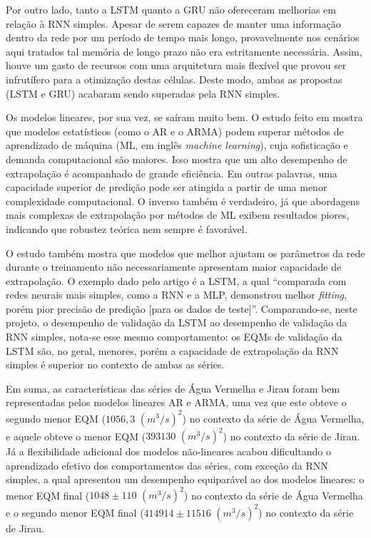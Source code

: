 \documentclass[a4paper]{article}
\begin{document}
\begin{multicols}{2}
Por outro lado, tanto a LSTM quanto a GRU não ofereceram melhorias em relação à RNN simples. Apesar de serem capazes de manter uma informação dentro da rede por um período de tempo mais longo, provavelmente nos cenários aqui tratados tal memória de longo prazo não era estritamente necessária. Assim, houve um gasto de recursos com uma arquitetura mais flexível que provou ser infrutífero para a otimização destas células. Deste modo, ambas as propostas (LSTM e GRU) acabaram sendo superadas pela RNN simples. 

Os modelos lineares, por sua vez, se saíram muito bem. O estudo feito em \cite{makridakis} mostra que modelos estatísticos (como o AR e o ARMA) podem superar métodos de aprendizado de máquina (ML, em inglês \emph{machine learning}), cuja sofisticação e demanda computacional são maiores. Isso mostra que um alto desempenho de extrapolação é acompanhado de grande eficiência. Em outras palavras, uma capacidade superior de predição pode ser atingida a partir de uma menor complexidade computacional. O inverso também é verdadeiro, já que abordagens mais complexas de extrapolação por métodos de ML exibem resultados piores, indicando que robustez teórica nem sempre é favorável.

O estudo \cite{makridakis} também mostra que modelos que melhor ajustam os parâmetros da rede durante o treinamento não necessariamente apresentam maior capacidade de extrapolação. O exemplo dado pelo artigo é a LSTM, a qual ``comparada com redes neurais mais simples, como a RNN e a MLP, demonstrou melhor \emph{fitting}, porém pior precisão de predição [para os dados de teste]''. Comparando-se, neste projeto, o desempenho de validação da LSTM ao desempenho de validação da RNN simples, nota-se esse mesmo comportamento: os EQMs de validação da LSTM são, no geral, menores, porém a capacidade de extrapolação da RNN simples é superior no contexto de ambas as séries.

Em suma, as características das séries de Água Vermelha e Jirau foram bem representadas pelos modelos lineares AR e ARMA, uma vez que este obteve o segundo menor EQM ($1056,\!3 \,\, (m^3/s)^2$) no contexto da série de Água Vermelha, e aquele obteve o menor EQM ($393130 \,\,(m^3/s)^2$) no contexto da série de Jirau. Já a flexibilidade adicional dos modelos não-lineares acabou dificultando o aprendizado efetivo dos comportamentos das séries, com exceção da RNN simples, a qual apresentou um desempenho equiparável ao dos modelos lineares: o menor EQM final ($1048 \pm 110 \,\, (m^3/s)^2$) no contexto da série de Água Vermelha e o segundo menor EQM final ($414914 \pm 11516 \,\, (m^3/s)^2$) no contexto da série de Jirau.
    

\end{multicols}
\end{document}
